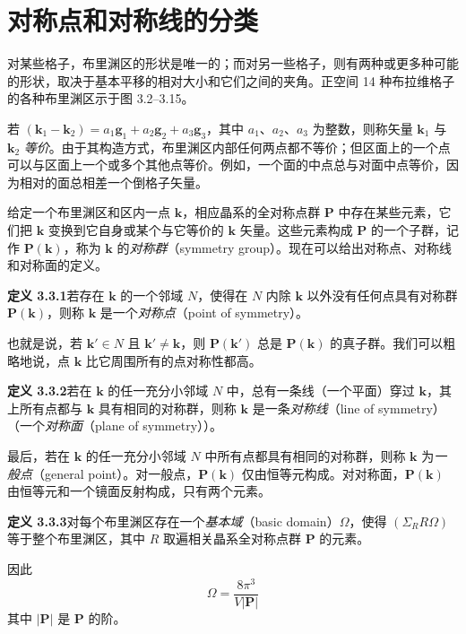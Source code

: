\section{对称点和对称线的分类}

对某些格子，布里渊区的形状是唯一的；而对另一些格子，则有两种或更多种可能的形状，取决于基本平移的相对大小和它们之间的夹角。正空间 14 种布拉维格子的各种布里渊区示于图 3.2--3.15。

若 $(\mathbf{k}_{1} - \mathbf{k}_{2}) = a_{1}\mathbf{g}_{1} + a_{2}\mathbf{g}_{2} + a_{3}\mathbf{g}_{3}$，其中 $a_{1}$、$a_{2}$、$a_{3}$ 为整数，则称矢量 $\mathbf{k}_{1}$ 与 $\mathbf{k}_{2}$ \textit{等价}。由于其构造方式，布里渊区内部任何两点都不等价；但区面上的一个点可以与区面上一个或多个其他点等价。例如，一个面的中点总与对面中点等价，因为相对的面总相差一个倒格子矢量。

给定一个布里渊区和区内一点 $\mathbf{k}$，相应晶系的全对称点群 $\mathbf{P}$ 中存在某些元素，它们把 $\mathbf{k}$ 变换到它自身或某个与它等价的 $\mathbf{k}$ 矢量。这些元素构成 $\mathbf{P}$ 的一个子群，记作 $\mathbf{P}(\mathbf{k})$，称为 $\mathbf{k}$ 的\textit{对称群}（symmetry group）。现在可以给出对称点、对称线和对称面的定义。

\noindent\textbf{定义 3.3.1}\quad 若存在 $\mathbf{k}$ 的一个邻域 $N$，使得在 $N$ 内除 $\mathbf{k}$ 以外没有任何点具有对称群 $\mathbf{P}(\mathbf{k})$，则称 $\mathbf{k}$ 是一个\textit{对称点}（point of symmetry）。

也就是说，若 $\mathbf{k}' \in N$ 且 $\mathbf{k}' \neq \mathbf{k}$，则 $\mathbf{P}(\mathbf{k}')$ 总是 $\mathbf{P}(\mathbf{k})$ 的真子群。我们可以粗略地说，点 $\mathbf{k}$ 比它周围所有的点对称性都高。

\noindent\textbf{定义 3.3.2}\quad 若在 $\mathbf{k}$ 的任一充分小邻域 $N$ 中，总有一条线（一个平面）穿过 $\mathbf{k}$，其上所有点都与 $\mathbf{k}$ 具有相同的对称群，则称 $\mathbf{k}$ 是一条\textit{对称线}（line of symmetry）（一个\textit{对称面}（plane of symmetry））。

最后，若在 $\mathbf{k}$ 的任一充分小邻域 $N$ 中所有点都具有相同的对称群，则称 $\mathbf{k}$ 为\textit{一般点}（general point）。对一般点，$\mathbf{P}(\mathbf{k})$ 仅由恒等元构成。对对称面，$\mathbf{P}(\mathbf{k})$ 由恒等元和一个镜面反射构成，只有两个元素。

\noindent\textbf{定义 3.3.3}\quad 对每个布里渊区存在一个\textit{基本域}（basic domain）$\Omega$，使得 $(\Sigma_{R} R\Omega)$ 等于整个布里渊区，其中 $R$ 取遍相关晶系全对称点群 $\mathbf{P}$ 的元素。

因此
\begin{equation*}
\Omega = \frac{8\pi^{3}}{V|\mathbf{P}|}
\tag{3.3.1}
\end{equation*}
其中 $|\mathbf{P}|$ 是 $\mathbf{P}$ 的阶。

